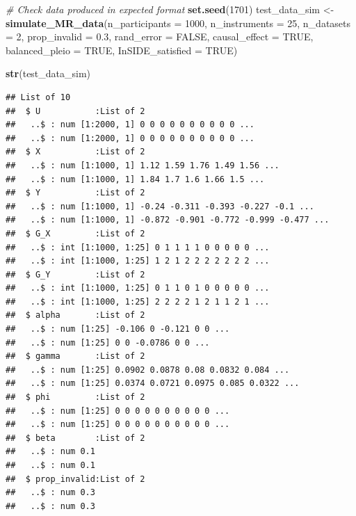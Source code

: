 \documentclass[
]{article}
\newenvironment{Shaded}{\begin{snugshade}}{\end{snugshade}}
\newcommand{\AttributeTok}[1]{\textcolor[rgb]{0.13,0.29,0.53}{#1}}
\newcommand{\CommentTok}[1]{\textcolor[rgb]{0.56,0.35,0.01}{\textit{#1}}}
\newcommand{\ConstantTok}[1]{\textcolor[rgb]{0.56,0.35,0.01}{#1}}
\newcommand{\DecValTok}[1]{\textcolor[rgb]{0.00,0.00,0.81}{#1}}
\newcommand{\FloatTok}[1]{\textcolor[rgb]{0.00,0.00,0.81}{#1}}
\newcommand{\FunctionTok}[1]{\textcolor[rgb]{0.13,0.29,0.53}{\textbf{#1}}}
\newcommand{\NormalTok}[1]{#1}
\newcommand{\OtherTok}[1]{\textcolor[rgb]{0.56,0.35,0.01}{#1}}
\begin{document}
\begin{Shaded}
\begin{Highlighting}[]
\CommentTok{\# Check data produced in expected format}
 \FunctionTok{set.seed}\NormalTok{(}\DecValTok{1701}\NormalTok{)}
\NormalTok{ test\_data\_sim }\OtherTok{\textless{}{-}} \FunctionTok{simulate\_MR\_data}\NormalTok{(}\AttributeTok{n\_participants =} \DecValTok{1000}\NormalTok{,}
                                   \AttributeTok{n\_instruments =} \DecValTok{25}\NormalTok{,}
                                   \AttributeTok{n\_datasets =} \DecValTok{2}\NormalTok{,}
                                   \AttributeTok{prop\_invalid =} \FloatTok{0.3}\NormalTok{,}
                                   \AttributeTok{rand\_error =} \ConstantTok{FALSE}\NormalTok{,}
                                   \AttributeTok{causal\_effect =} \ConstantTok{TRUE}\NormalTok{,}
                                   \AttributeTok{balanced\_pleio =} \ConstantTok{TRUE}\NormalTok{,}
                                   \AttributeTok{InSIDE\_satisfied =} \ConstantTok{TRUE}\NormalTok{)}

 \FunctionTok{str}\NormalTok{(test\_data\_sim)}
\end{Highlighting}
\end{Shaded}

\begin{verbatim}
## List of 10
##  $ U           :List of 2
##   ..$ : num [1:2000, 1] 0 0 0 0 0 0 0 0 0 0 ...
##   ..$ : num [1:2000, 1] 0 0 0 0 0 0 0 0 0 0 ...
##  $ X           :List of 2
##   ..$ : num [1:1000, 1] 1.12 1.59 1.76 1.49 1.56 ...
##   ..$ : num [1:1000, 1] 1.84 1.7 1.6 1.66 1.5 ...
##  $ Y           :List of 2
##   ..$ : num [1:1000, 1] -0.24 -0.311 -0.393 -0.227 -0.1 ...
##   ..$ : num [1:1000, 1] -0.872 -0.901 -0.772 -0.999 -0.477 ...
##  $ G_X         :List of 2
##   ..$ : int [1:1000, 1:25] 0 1 1 1 1 0 0 0 0 0 ...
##   ..$ : int [1:1000, 1:25] 1 2 1 2 2 2 2 2 2 2 ...
##  $ G_Y         :List of 2
##   ..$ : int [1:1000, 1:25] 0 1 1 0 1 0 0 0 0 0 ...
##   ..$ : int [1:1000, 1:25] 2 2 2 2 1 2 1 1 2 1 ...
##  $ alpha       :List of 2
##   ..$ : num [1:25] -0.106 0 -0.121 0 0 ...
##   ..$ : num [1:25] 0 0 -0.0786 0 0 ...
##  $ gamma       :List of 2
##   ..$ : num [1:25] 0.0902 0.0878 0.08 0.0832 0.084 ...
##   ..$ : num [1:25] 0.0374 0.0721 0.0975 0.085 0.0322 ...
##  $ phi         :List of 2
##   ..$ : num [1:25] 0 0 0 0 0 0 0 0 0 0 ...
##   ..$ : num [1:25] 0 0 0 0 0 0 0 0 0 0 ...
##  $ beta        :List of 2
##   ..$ : num 0.1
##   ..$ : num 0.1
##  $ prop_invalid:List of 2
##   ..$ : num 0.3
##   ..$ : num 0.3
\end{verbatim}
\end{document}
